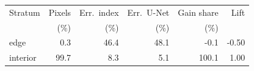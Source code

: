 \begin{tabular}{@{}lrrrrr@{}}
\toprule
Stratum & Pixels & Err.\ index & Err.\ U-Net & Gain share & Lift \\
 & (\%) & (\%) & (\%) & (\%) & \\
\midrule
edge & 0.3 & 46.4 & 48.1 & -0.1 & -0.50 \\
interior & 99.7 & 8.3 & 5.1 & 100.1 & 1.00 \\
\bottomrule
\end{tabular}